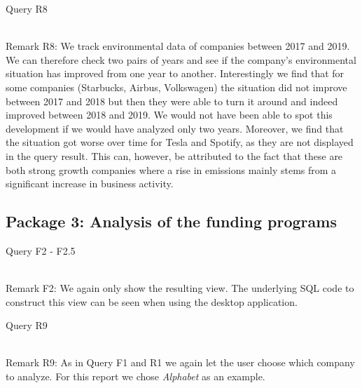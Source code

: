 \begin{table}[!htb]
    \caption{Query R8}
	 \\
    Remark R8: We track environmental data of companies between 2017 and 2019.
We can therefore check two pairs of years and see if the company's environmental situation has improved from one year to
another.
Interestingly we find that for some companies (Starbucks, Airbus, Volkswagen) the situation did not improve between 2017
and 2018 but then they were able to turn it around and indeed improved between 2018 and 2019.
We would not have been able to spot this development if we would have analyzed only two years.
Moreover, we find that the situation got worse over time for Tesla and Spotify, as they are not displayed in the query result.
This can, however, be attributed to the fact that these are both strong growth companies where a rise in emissions mainly
stems from a significant increase in business activity.
\end{table}



\clearpage
\newpage
\subsection{Package 3: Analysis of the funding programs}

\begin{table}[!htb]
    \caption{Query F2 - F2.5}
     \\
    Remark F2: We again only show the resulting view.
    The underlying SQL code to construct this view can be seen when
    using the desktop application.
\end{table}

\begin{table}[!htb]
    \caption{Query R9}
	 \\
    Remark R9: As in Query F1 and R1 we again let the user choose which company to analyze.
For this report we chose \textit{Alphabet} as an example.
\end{table}



